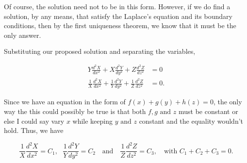 \documentclass[english,a4paper,12pt]{report}
\begin{document}
Of course, the solution need not to be in this form. However, if we do find a solution, by any means, that satisfy the Laplace's equation and its boundary conditions, then by the first uniqueness theorem, we know that it must be the only answer. 
    
Substituting our proposed solution and separating the variables,
    
\begin{equation}
    \begin{aligned}
        Y \frac{d^2X}{dx^2} + X \frac{d^2Y}{dy^2} + Z \frac{d^2Z}{dz^2} &= 0 \\
        \frac{1}{X} \frac{d^2X}{dx^2} + \frac{1}{Y} \frac{d^2Y}{dy^2} + \frac{1}{Z} \frac{d^2Z}{dz^2} &= 0. 
    \end{aligned}
\end{equation}
    
Since we have an equation in the form of \(f(x) + g(y) + h(z) = 0\), the only way the this could possibly be true is that both  \(f,g \text{ and }  z\) must be constant or else I could say vary \(x\) while keeping \(y \text { and } z\) constant and the equality wouldn't hold. Thus, we have
    
\begin{equation}
    \frac{1}{X} \frac{d^2X}{dx^2} = C_1, ~~~\frac{1}{Y} \frac{d^2Y}{dy^2} = C_2 ~~~ \text{ and } ~~~ \frac{1}{Z} \frac{d^2Z}{dz^2} = C_3, ~~~ \text{ with }  C_1 + C_2 + C_3 = 0.
\end{equation}
\end{document}
